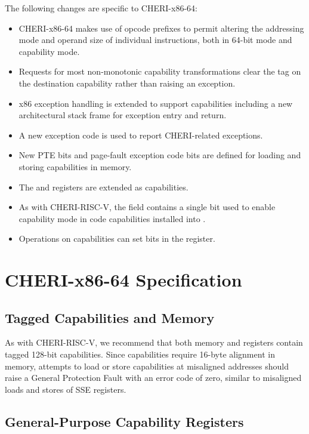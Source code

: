 The following changes are specific to CHERI-x86-64:

\begin{itemize}
 \item CHERI-x86-64 makes use of opcode prefixes to permit altering
   the addressing mode and operand size of individual instructions,
   both in 64-bit mode and capability mode.
 \item Requests for most non-monotonic capability transformations
   clear the tag on the destination capability rather than raising an
   exception.
 \item x86 exception handling is extended to support capabilities
   including a new architectural stack frame for exception entry and
   return.
 \item A new exception code is used to report CHERI-related
   exceptions.
 \item New PTE bits and page-fault exception code bits are defined for
   loading and storing capabilities in memory.
 \item The \FSBASE{} and \GSBASE{} registers are extended as
   capabilities.
 \item As with CHERI-RISC-V, the \cflags{} field contains a single bit
   used to enable capability mode in code capabilities installed into
   \CIP{}.
 \item Operations on capabilities can set bits in the \RFLAGS{}
   register.
\end{itemize}

\section{CHERI-x86-64 Specification}

\subsection{Tagged Capabilities and Memory}

As with CHERI-RISC-V, we recommend that both memory and
registers contain tagged 128-bit capabilities.
Since capabilities require 16-byte alignment in memory, attempts to
load or store capabilities at misaligned addresses should raise a
General Protection Fault with an error code of zero, similar to
misaligned loads and stores of SSE registers.

\subsection{General-Purpose Capability Registers}

